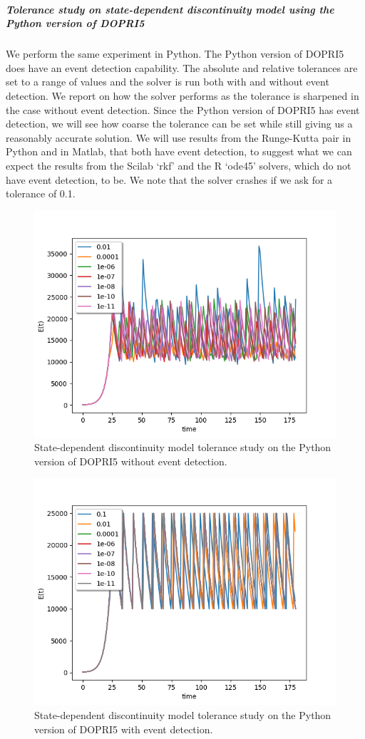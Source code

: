 \subparagraph{Tolerance study on state-dependent discontinuity model using the Python version of DOPRI5}
We perform the same experiment in Python. The Python version of DOPRI5 does have an event detection capability. The absolute and relative tolerances are set to a range of values and the solver is run both with and without event detection. We report on how the solver performs as the tolerance is sharpened in the case without event detection. Since the Python version of DOPRI5 has event detection, we will see how coarse the tolerance can be set while still giving us a reasonably accurate solution. We will use results from the Runge-Kutta pair in Python and in Matlab, that both have event detection, to suggest what we can expect the results from the Scilab `rkf' and  the R `ode45' solvers, which do not have event detection,  to be. We note that the solver crashes if we ask for a tolerance of 0.1.

\begin{figure}[h]
\centering
\includegraphics[width=0.7\linewidth]{./figures/tolerance_state_rk45_no_event_py}
\caption{State-dependent discontinuity model tolerance study on the Python version of DOPRI5 without event detection.}
\label{fig:tolerance_state_rk45_no_event_py}
\end{figure}

\begin{figure}[h]
\centering
\includegraphics[width=0.7\linewidth]{./figures/tolerance_state_rk45_with_event_py}
\caption{State-dependent discontinuity model tolerance study on the Python version of DOPRI5 with event detection.}
\label{fig:tolerance_state_rk45_with_event_py}
\end{figure}

